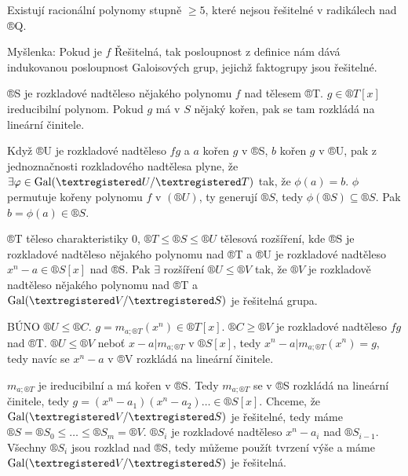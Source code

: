 \documentclass[12pt]{article}                   %
\begin{document}
    \begin{dusledek}
        Existují racionální polynomy stupně $≥5$, které nejsou řešitelné v radikálech nad ®Q.
    \end{dusledek}

    \begin{dukaz}
        Myšlenka: Pokud je $f$ Řešitelná, tak posloupnost z definice nám dává indukovanou posloupnost Galoisových grup, jejichž faktogrupy jsou řešitelné.

        \begin{lemmain}
            ®S je rozkladové nadtěleso nějakého polynomu $f$ nad tělesem ®T. $g \in ®T[x]$ ireducibilní polynom. Pokud $g$ má v $S$ nějaký kořen, pak se tam rozkládá na lineární činitele.

            \begin{dukazin}
                Když ®U je rozkladové nadtěleso $fg$ a $a$ kořen $g$ v ®S, $b$ kořen $g$ v ®U, pak z jednoznačnosti rozkladového nadtělesa plyne, že $\exists \phi \in \Gal(®U/®T)$ tak, že $\phi(a)=b$. $\phi$ permutuje kořeny polynomu $f$ v $(®U)$, ty generují $®S$, tedy $\phi(®S)\subseteq ®S$. Pak $b = \phi(a)\in ®S$.
            \end{dukazin}
        \end{lemmain}

        \begin{lemmain}
            ®T těleso charakteristiky 0, $®T≤®S≤®U$ tělesová rozšíření, kde ®S je rozkladové nadtěleso nějakého polynomu nad ®T a ®U je rozkladové nadtěleso $x^n-a \in ®S[x]$ nad ®S. Pak $\exists$ rozšíření $®U ≤ ®V$ tak, že $®V$ je rozkladově nadtěleso nějakého polynomu nad ®T a $\Gal(®V/®S)$ je řešitelná grupa.

            \begin{dukazin}
                BÚNO $®U ≤ ®C$. $g = m_{a;®T}(x^n) \in ®T[x]$. $®C≥®V$ je rozkladové nadtěleso $fg$ nad ®T. $®U ≤ ®V$ neboť $x-a|m_{a;®T}$ v $®S[x]$, tedy $x^n - a|m_{a;®T}(x^n)=g$, tedy navíc se $x^n-a$ v ®V rozkládá na lineární činitele.

                $m_{a;®T}$ je ireducibilní a má kořen v ®S. Tedy $m_{a;®T}$ se v ®S rozkládá na lineární činitele, tedy $g=(x^n-a_1)(x^n-a_2)… \in ®S[x]$. Chceme, že $\Gal(®V/®S)$ je řešitelné, tedy máme $®S=®S_0≤…≤®S_m=®V$. $®S_i$ je rozkladové nadtěleso $x^n-a_i$ nad $®S_{i-1}$. Všechny $®S_i$ jsou rozklad nad ®S, tedy můžeme použít tvrzení výše a máme $\Gal(®V/®S)$ je řešitelná.
            \end{dukazin}
        \end{lemmain}


\end{dukaz}
\end{document}
